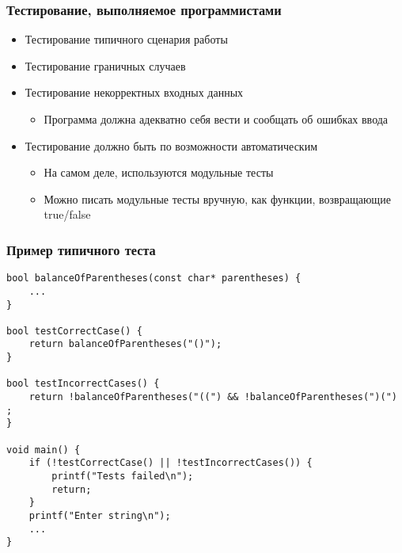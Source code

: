 \documentclass{../../slides-style}
\begin{document}
    \begin{frame}
        \frametitle{Тестирование, выполняемое программистами}
        \begin{itemize}
            \item Тестирование типичного сценария работы
            \item Тестирование граничных случаев
            \item Тестирование некорректных входных данных
            \begin{itemize}
                \item Программа должна адекватно себя вести и сообщать об ошибках ввода
            \end{itemize}
            \item Тестирование должно быть по возможности автоматическим
            \begin{itemize}
                \item На самом деле, используются модульные тесты
                \item Можно писать модульные тесты вручную, как функции, возвращающие true/false
            \end{itemize}
        \end{itemize}
    \end{frame}
    
    \begin{frame}[fragile]
        \frametitle{Пример типичного теста}
        \begin{footnotesize}
            \begin{verbatim}
bool balanceOfParentheses(const char* parentheses) {
    ...
}

bool testCorrectCase() {
    return balanceOfParentheses("()");
}

bool testIncorrectCases() {
    return !balanceOfParentheses("((") && !balanceOfParentheses(")(") ;
}

void main() {
    if (!testCorrectCase() || !testIncorrectCases()) {
        printf("Tests failed\n");
        return;
    }
    printf("Enter string\n");
    ...
}
            \end{verbatim}
        \end{footnotesize}
    \end{frame}
\end{document}
